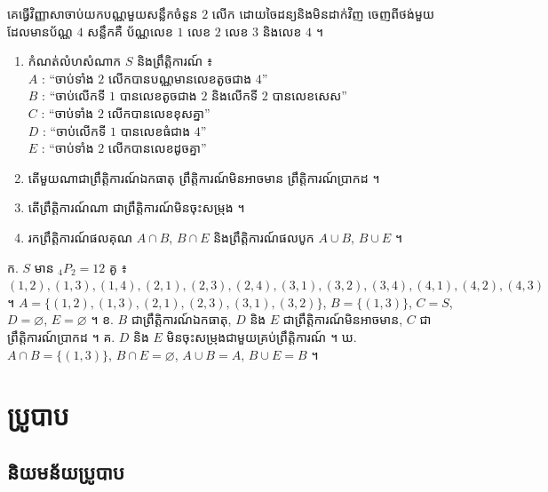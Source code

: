 \begin{pro}
គេធ្វើវិញ្ញាសាចាប់យកបណ្ណមួយសន្លឹកចំនួន $2$ លើក ដោយចៃដន្យនិងមិនដាក់វិញ ចេញពីថង់មួយ ដែលមានប័ណ្ណ $4$ សន្លឹកគឺ ប័ណ្ណលេខ $1$ លេខ $2$ លេខ $3$ និងលេខ $4$ ។
\begin{enumerate}[a]
  \item កំណត់លំហសំណាក $S$ និងព្រឹត្តិការណ៍ ៖\\
  $A$ : “ចាប់ទាំង $2$ លើកបានបណ្ណមានលេខតូចជាង $4$”\\
  $B$ : “ចាប់លើកទី $1$ បានលេខតូចជាង $2$ និងលើកទី $2$ បានលេខសេស”\\
  $C$ : “ចាប់ទាំង $2$ លើកបានលេខខុសគ្នា”\\
  $D$ : “ចាប់លើកទី $1$ បានលេខធំជាង $4$”\\
  $E$ : “ចាប់ទាំង $2$ លើកបានលេខដូចគ្នា”
  \item តើមួយណាជាព្រឹត្តិការណ៍ឯកធាតុ ព្រឹត្តិការណ៍មិនអាចមាន ព្រឹត្តិការណ៍ប្រាកដ ។
  \item តើព្រឹត្តិការណ៍ណា ជាព្រឹត្តិការណ៍មិនចុះសម្រុង ។
  \item រកព្រឹត្តិការណ៍ផលគុណ $A \cap B$, $B \cap E$ និងព្រឹត្តិការណ៍ផលបូក $A \cup B$, $B \cup E$ ។
\end{enumerate}
\ans
ក. $S$ មាន ${}_4P_2 = 12$ គូ ៖ $(1,2), (1,3), (1,4), (2,1), (2,3), (2,4), (3,1), (3,2), (3,4), (4,1), (4,2), (4,3)$ ។ $A = \{(1,2), (1,3), (2,1), (2,3), (3,1), (3,2)\}$, $B = \{(1,3)\}$, $C = S$, $D = \varnothing$, $E = \varnothing$ ។ \quad ខ. $B$ ជាព្រឹត្តិការណ៍ឯកធាតុ, $D$ និង $E$ ជាព្រឹត្តិការណ៍មិនអាចមាន, $C$ ជាព្រឹត្តិការណ៍ប្រាកដ ។ \quad គ. $D$ និង $E$ មិនចុះសម្រុងជាមួយគ្រប់ព្រឹត្តិការណ៍ ។ \quad ឃ. $A \cap B = \{(1,3)\}$, $B \cap E = \varnothing$, $A \cup B = A$, $B \cup E = B$ ។
\end{pro}

\section{ប្រូបាប}
\subsection{និយមន័យប្រូបាប}


